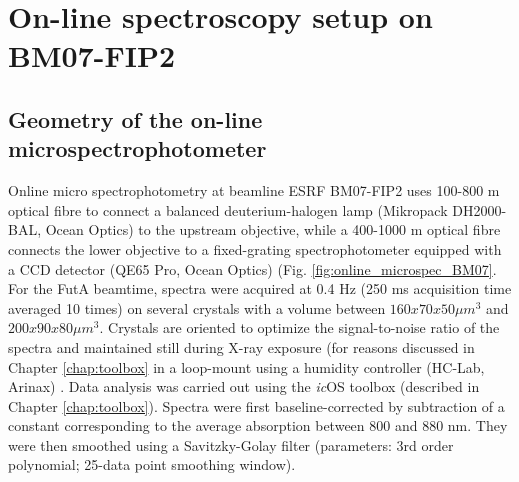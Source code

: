 \section{On-line spectroscopy setup on BM07-FIP2}
\subsection{Geometry of the on-line microspectrophotometer}

Online micro spectrophotometry at beamline ESRF BM07-FIP2 uses 100-800 \textmu m optical fibre to connect a balanced deuterium-halogen lamp (Mikropack DH2000- BAL, Ocean Optics) to the upstream objective, while a 400-1000 \textmu m optical fibre connects the lower objective to a fixed-grating spectrophotometer equipped with a CCD detector (QE65 Pro, Ocean Optics) (Fig. \ref{fig:online_microspec_BM07}. For the FutA beamtime, spectra were acquired at 0.4 Hz (250 ms acquisition time averaged 10 times) on several crystals with a volume between \(160 x 70 x 50 \mu m^{3}\) and \(200 x 90 x 80 \mu m^{3}\). Crystals are oriented to optimize the signal-to-noise ratio of the spectra and maintained still during X-ray exposure (for reasons discussed in Chapter \ref{chap:toolbox} in a loop-mount using a humidity controller (HC-Lab, Arinax) \parencite{sanchez-weatherbyImprovingDiffractionHumidity2009}. Data analysis was carried out using the \textit{ic}OS toolbox (described in Chapter \ref{chap:toolbox}). Spectra were first baseline-corrected by subtraction of a constant corresponding to the average absorption between 800 and 880 nm. They were then smoothed using a Savitzky-Golay filter (parameters: 3rd order polynomial; 25-data point smoothing window).

